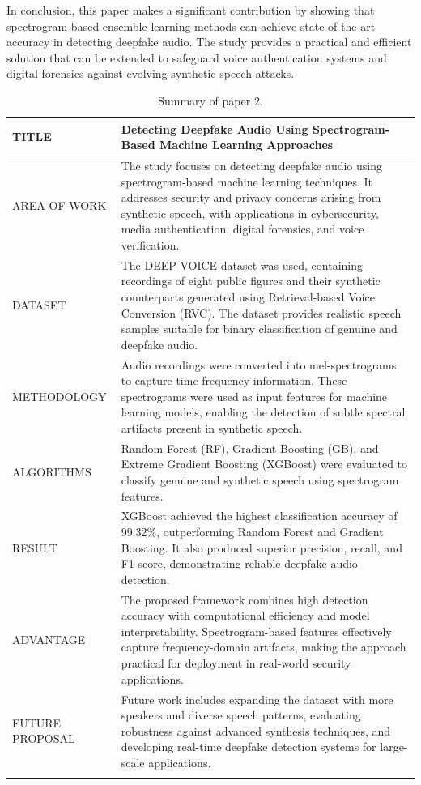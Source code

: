 \documentclass[12pt,a4paper]{report}
\begin{document}
In conclusion, this paper makes a significant contribution by showing that spectrogram‑based ensemble learning methods can achieve state‑of‑the‑art accuracy in detecting deepfake audio. The study provides a practical and efficient solution that can be extended to safeguard voice authentication systems and digital forensics against evolving synthetic speech attacks.
\clearpage
\renewcommand{\arraystretch}{1.5}

\begin{longtable}{|p{4cm}|p{11cm}|}
\hline

TITLE &
Detecting Deepfake Audio Using Spectrogram-Based Machine Learning Approaches \\ \hline

AREA OF WORK &
The study focuses on detecting deepfake audio using spectrogram-based machine learning techniques. It addresses security and privacy concerns arising from synthetic speech, with applications in cybersecurity, media authentication, digital forensics, and voice verification. \\ \hline

DATASET &
The DEEP-VOICE dataset was used, containing recordings of eight public figures and their synthetic counterparts generated using Retrieval-based Voice Conversion (RVC). The dataset provides realistic speech samples suitable for binary classification of genuine and deepfake audio. \\ \hline

METHODOLOGY &
Audio recordings were converted into mel-spectrograms to capture time-frequency information. These spectrograms were used as input features for machine learning models, enabling the detection of subtle spectral artifacts present in synthetic speech. \\ \hline

ALGORITHMS &
Random Forest (RF), Gradient Boosting (GB), and Extreme Gradient Boosting (XGBoost) were evaluated to classify genuine and synthetic speech using spectrogram features. \\ \hline

RESULT &
XGBoost achieved the highest classification accuracy of 99.32\%, outperforming Random Forest and Gradient Boosting. It also produced superior precision, recall, and F1-score, demonstrating reliable deepfake audio detection. \\ \hline

ADVANTAGE &
The proposed framework combines high detection accuracy with computational efficiency and model interpretability. Spectrogram-based features effectively capture frequency-domain artifacts, making the approach practical for deployment in real-world security applications. \\ \hline

FUTURE PROPOSAL &
Future work includes expanding the dataset with more speakers and diverse speech patterns, evaluating robustness against advanced synthesis techniques, and developing real-time deepfake detection systems for large-scale applications. \\ \hline

\caption[Summary of paper 2]{Summary of paper 2.}
\label{tab:paper2_summary}

\end{longtable}
\end{document}
